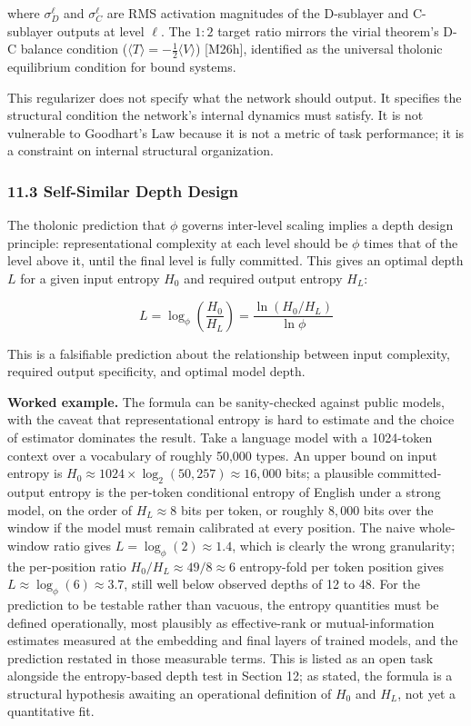 \documentclass[
  11pt,
  letterpaper,
]{article}
\begin{document}
where \(\sigma_D^\ell\) and \(\sigma_C^\ell\) are RMS activation
magnitudes of the D-sublayer and C-sublayer outputs at level \(\ell\).
The \(1:2\) target ratio mirrors the virial theorem's D-C balance
condition (\(\langle T \rangle = -\frac{1}{2}\langle V \rangle\))
{[}M26h{]}, identified as the universal tholonic equilibrium condition
for bound systems.

This regularizer does not specify what the network should output. It
specifies the structural condition the network's internal dynamics must
satisfy. It is not vulnerable to Goodhart's Law because it is not a
metric of task performance; it is a constraint on internal structural
organization.

\subsubsection{11.3 Self-Similar Depth
Design}\label{self-similar-depth-design}

The tholonic prediction that \(\phi\) governs inter-level scaling
implies a depth design principle: representational complexity at each
level should be \(\phi\) times that of the level above it, until the
final level is fully committed. This gives an optimal depth \(L\) for a
given input entropy \(H_0\) and required output entropy \(H_L\):

\[L = \log_\phi \left( \frac{H_0}{H_L} \right) = \frac{\ln(H_0/H_L)}{\ln \phi}\]

This is a falsifiable prediction about the relationship between input
complexity, required output specificity, and optimal model depth.

\textbf{Worked example.} The formula can be sanity-checked against
public models, with the caveat that representational entropy is hard to
estimate and the choice of estimator dominates the result. Take a
language model with a 1024-token context over a vocabulary of roughly
50,000 types. An upper bound on input entropy is
\(H_0 \approx 1024 \times \log_2(50{,}257) \approx 16{,}000\) bits; a
plausible committed-output entropy is the per-token conditional entropy
of English under a strong model, on the order of \(H_L \approx 8\) bits
per token, or roughly \(8{,}000\) bits over the window if the model must
remain calibrated at every position. The naive whole-window ratio gives
\(L = \log_\phi(2) \approx 1.4\), which is clearly the wrong
granularity; the per-position ratio \(H_0/H_L \approx 49/8 \approx 6\)
entropy-fold per token position gives
\(L \approx \log_\phi(6) \approx 3.7\), still well below observed depths
of 12 to 48. For the prediction to be testable rather than vacuous, the
entropy quantities must be defined operationally, most plausibly as
effective-rank or mutual-information estimates measured at the embedding
and final layers of trained models, and the prediction restated in those
measurable terms. This is listed as an open task alongside the
entropy-based depth test in Section 12; as stated, the formula is a
structural hypothesis awaiting an operational definition of \(H_0\) and
\(H_L\), not yet a quantitative fit.
\end{document}
